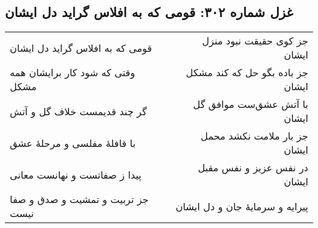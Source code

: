 \begin{center}
\section*{غزل شماره ۳۰۲: قومی که به افلاس گراید دل ایشان}
\label{sec:302}
\begin{longtable}{l p{0.5cm} r}
قومی که به افلاس گراید دل ایشان
&&
جز کوی حقیقت نبود منزل ایشان
\\
وقتی که شود کار برایشان همه مشکل
&&
جز باده بگو حل که کند مشکل ایشان
\\
گر چند قدیمست خلاف گل و آتش
&&
با آتش عشق‌ست موافق گل ایشان
\\
با قافلهٔ مفلسی و مرحلهٔ عشق
&&
جز بار ملامت نکشد محمل ایشان
\\
پیدا ز صفاتست و نهانست معانی
&&
در نفس عزیز و نفس مقبل ایشان
\\
جز تربیت و تمشیت و صدق و صفا نیست
&&
پیرایه و سرمایهٔ جان و دل ایشان
\\
\end{longtable}
\end{center}
